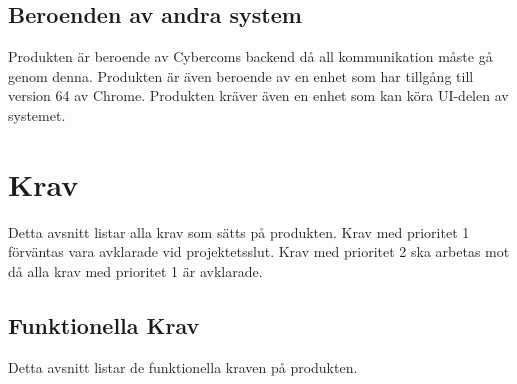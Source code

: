 \documentclass[10pt]{article}
\begin{document}
	
	\subsection{Beroenden av andra system}
	Produkten är beroende av Cybercoms backend då all kommunikation måste gå genom denna. Produkten är även beroende av en enhet som har tillgång till version 64 av Chrome. Produkten kräver även en enhet som kan köra UI-delen av systemet.

\pagebreak
\section{Krav}
	Detta avsnitt listar alla krav som sätts på produkten. Krav med prioritet 1 förväntas vara avklarade vid projektetsslut. Krav med prioritet 2 ska arbetas mot då alla krav med prioritet 1 är avklarade.
	\subsection{Funktionella Krav}
	Detta avsnitt listar de funktionella kraven på produkten.	
	
\end{document}
